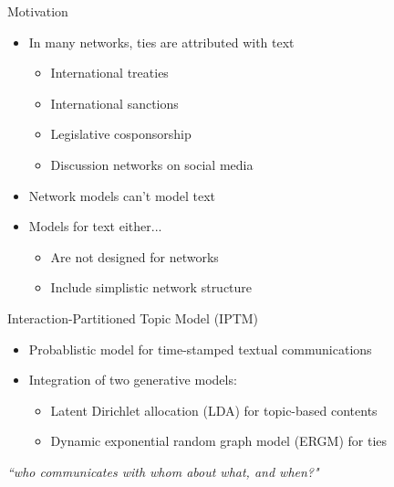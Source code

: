 \documentclass[10pt]{beamer}
\def\bni{\begin{itemize}} \def\ei{\end{itemize}}
\theoremstyle{definition}
\theoremstyle{remark}
\begin{document}
\begin{frame}{Motivation}
\Large
\begin{itemize}
\item In many networks, ties are attributed with text
\begin{itemize}
\item International treaties
\item International sanctions
\item Legislative cosponsorship
\item Discussion networks on social media
\end{itemize}
\vspace{.2cm}
\item Network models can't model text
\vspace{.3cm}
\item Models for text either...
\begin{itemize}
\item Are not designed for networks
\item Include simplistic network structure
\end{itemize}
\end{itemize}
\end{frame}

\begin{frame}{Interaction-Partitioned Topic Model (IPTM)}
\large
	\bni
	\item Probablistic model for time-stamped textual communications 
	\vspace{0.2cm}
	\item Integration of two generative models:
	\begin{itemize}
	 \item Latent Dirichlet allocation (LDA) for topic-based contents
	  \item Dynamic exponential random graph model (ERGM) for ties 
	  \end{itemize}
	\ei
		\vspace{0.4cm}
\centering \large\textit{``who communicates with whom about what, and when?"}
\end{frame}
\end{document}
